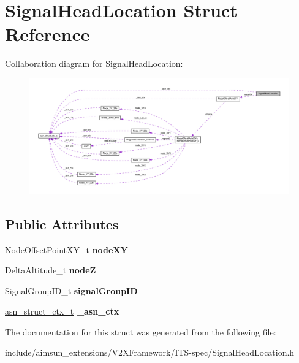 \hypertarget{structSignalHeadLocation}{}\section{Signal\+Head\+Location Struct Reference}
\label{structSignalHeadLocation}


Collaboration diagram for Signal\+Head\+Location\+:\nopagebreak
\begin{figure}[H]
\begin{center}
\leavevmode
\includegraphics[width=350pt]{structSignalHeadLocation__coll__graph}
\end{center}
\end{figure}
\subsection*{Public Attributes}
\begin{DoxyCompactItemize}
\item 
\hyperlink{structNodeOffsetPointXY}{Node\+Offset\+Point\+X\+Y\+\_\+t} {\bfseries node\+XY}\hypertarget{structSignalHeadLocation_a6d3ad4ed9c31277e0f488d42a1120b66}{}\label{structSignalHeadLocation_a6d3ad4ed9c31277e0f488d42a1120b66}

\item 
Delta\+Altitude\+\_\+t {\bfseries nodeZ}\hypertarget{structSignalHeadLocation_a6b66cad97189a78d0d1f0f3df2dbcf06}{}\label{structSignalHeadLocation_a6b66cad97189a78d0d1f0f3df2dbcf06}

\item 
Signal\+Group\+I\+D\+\_\+t {\bfseries signal\+Group\+ID}\hypertarget{structSignalHeadLocation_ae8e571ea1e09335e0c8be02dbdfb8c21}{}\label{structSignalHeadLocation_ae8e571ea1e09335e0c8be02dbdfb8c21}

\item 
\hyperlink{structasn__struct__ctx__s}{asn\+\_\+struct\+\_\+ctx\+\_\+t} {\bfseries \+\_\+asn\+\_\+ctx}\hypertarget{structSignalHeadLocation_a73a5726f647bf7ca8882ddee16a8018f}{}\label{structSignalHeadLocation_a73a5726f647bf7ca8882ddee16a8018f}

\end{DoxyCompactItemize}


The documentation for this struct was generated from the following file\+:\begin{DoxyCompactItemize}
\item 
include/aimsun\+\_\+extensions/\+V2\+X\+Framework/\+I\+T\+S-\/spec/Signal\+Head\+Location.\+h\end{DoxyCompactItemize}
